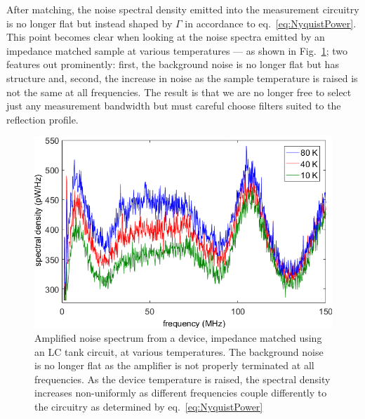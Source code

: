 After matching, the noise spectral density emitted into the measurement circuitry is no longer flat but instead shaped by $\Gamma$ in accordance to eq.~\ref{eq:NyquistPower}. This point becomes clear when looking at the noise spectra emitted by an impedance matched sample at various temperatures --- as shown in Fig.~\ref{fig:spectrum_matching}; two features out prominently: first, the background noise is no longer flat but has structure and, second, the increase in noise as the sample temperature is raised is not the same at all frequencies. The result is that we are no longer free to select just any measurement bandwidth but must careful choose filters suited to the reflection profile.
\begin{figure}
\centering
\includegraphics[width = 120mm]{figures/Johnson_noise_thermometry/Matched_spectra.png}
\caption{Amplified noise spectrum from a device, impedance matched using an LC tank circuit, at various temperatures. The background noise is no longer flat as the amplifier is not properly terminated at all frequencies. As the device temperature is raised, the spectral density increases non-uniformly as different frequencies couple differently to the circuitry as determined by eq.~\ref{eq:NyquistPower}}
\label{fig:spectrum_matching}
\end{figure}

